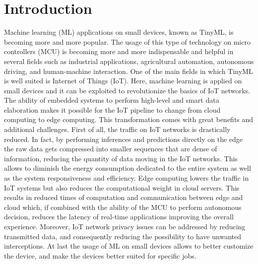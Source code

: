 \documentclass[12pt]{report}
\newcommand{\mychapter}[2]{
    \setcounter{chapter}{#1}
    \setcounter{section}{0}
    \chapter*{#2}
    \addcontentsline{toc}{chapter}{#2}
    }
\newcommand\blankpage{%
    \null
    \thispagestyle{empty}%
    \addtocounter{page}{0}%
    \newpage}
\begin{document}
\begin{figure}
 \centering 
 
\end{figure}

\afterpage{\blankpage}

\tableofcontents
\listoffigures
\listoftables
\afterpage{\blankpage}




\mychapter{0}{Introduction}

\label{intro}
Machine learning (ML) applications on small devices, known as TinyML, is becoming more and more popular. The usage of this type of technology on micro controllers (MCU) is becoming more and more indispensable and helpful in several fields such as industrial applications, agricultural automation, autonomous driving, and human-machine interaction. One of the main fields in which TinyML is well suited is Internet of Things (IoT). Here, machine learning is applied on small devices and it can be exploited to revolutionize the basics of IoT networks.\\
The ability of embedded systems to perform high-level and smart data elaboration makes it possible for the IoT pipeline to change from cloud computing to edge computing. This transformation comes with great benefits and additional challenges.
First of all, the traffic on IoT networks is drastically reduced. In fact, by performing inferences and predictions directly on the edge the raw data gets compressed into smaller sequences that are dense of information, reducing the quantity of data moving in the IoT networks. This allows to diminish the energy consumption dedicated to the entire system as well as the system responsiveness and efficiency.
Edge computing lowers the traffic in IoT systems but also reduces the computational weight in cloud servers. This results in reduced times of computation and communication between edge and cloud which, if combined with the ability of the MCU to perform autonomous decision, reduces the latency of real-time applications improving the overall experience.
Moreover, IoT network privacy issues can be addressed by reducing transmitted data, and consequently reducing the possibility to have unwanted interceptions.
At last the usage of ML on small devices allows to better customize the device, and make the devices better suited for specific jobs. \\
\end{document}
